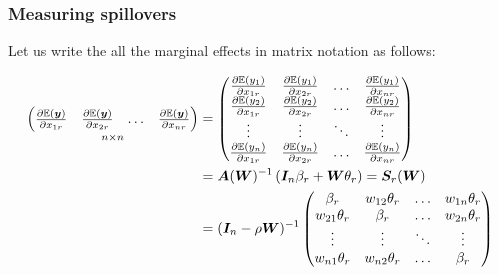 \documentclass[english,10pt]{beamer}\usepackage[]{graphicx}\usepackage[]{xcolor}
\begin{document}
\begin{frame}
\frametitle{Measuring spillovers}
Let us write the all the marginal effects in matrix notation as follows:


\begin{equation*}\label{eq:matrix_marginal_effects}
\begin{aligned}
 \underset{n \times n}{\begin{pmatrix}
  \frac{\partial \mathbb{E}(\bm y)}{\partial x_{1r}} & \frac{\partial \mathbb{E}(\bm y)}{\partial x_{2r}} & \hdots & \frac{\partial \mathbb{E}(\bm y)}{\partial x_{nr}} 
   \end{pmatrix}} & = 
  \begin{pmatrix}
  \frac{\partial \mathbb{E}(y_1)}{\partial x_{1r}} & \frac{\partial \mathbb{E}(y_1)}{\partial x_{2r}} & \hdots & \frac{\partial \mathbb{E}(y_1)}{\partial x_{nr}} \\
  \frac{\partial \mathbb{E}(y_2)}{\partial x_{1r}} & \frac{\partial \mathbb{E}(y_2)}{\partial x_{2r}} & \hdots & \frac{\partial \mathbb{E}(y_2)}{\partial x_{nr}} \\
  \vdots & \vdots & \ddots & \vdots \\
  \frac{\partial \mathbb{E}(y_n)}{\partial x_{1r}} & \frac{\partial \mathbb{E}(y_n)}{\partial x_{2r}} & \hdots & \frac{\partial \mathbb{E}(y_n)}{\partial x_{nr}} 
  \end{pmatrix} \\
  & = \bm A(\bm W)^{-1}\left(\bm I_n\beta_r + \bm W\theta_r\right) = \bm S_r(\bm W) \\
  & = (\bm I_n - \rho\bm W)^{-1}
  \begin{pmatrix}
    \beta_r  & w_{12} \theta_r  & \hdots & w_{1n}\theta_r \\
    w_{21} \theta_r  & \beta_r   & \hdots & w_{2n}\theta_r \\
    \vdots & \vdots & \ddots & \vdots \\
    w_{n1} \theta_r  & w_{n2} \theta_r  & \hdots  & \beta_r \\
  \end{pmatrix}
\end{aligned}  
\end{equation*}
\end{frame}
\end{document}
